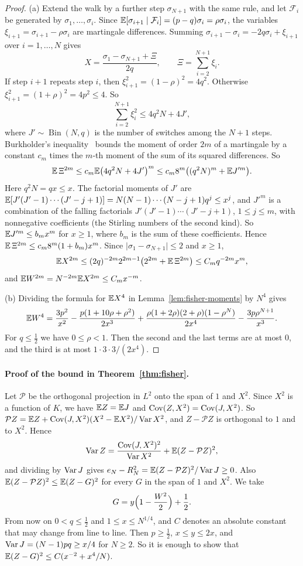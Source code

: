 \begin{proof}
(a) Extend the walk by a further step $\sigma_{N+1}$ with the same rule, and
let $\mathcal F_i$ be generated by $\sigma_1,\dots,\sigma_i$. Since
$\mathbb{E}[\sigma_{i+1}\mid\mathcal F_i]=(p-q)\sigma_i=\rho\sigma_i$, the variables
$\xi_{i+1}=\sigma_{i+1}-\rho\sigma_i$ are martingale differences. Summing
$\sigma_{i+1}-\sigma_i=-2q\sigma_i+\xi_{i+1}$ over $i=1,\dots,N$ gives
\[
 X=\frac{\sigma_1-\sigma_{N+1}+\Xi}{2q},\qquad
 \Xi=\sum_{i=2}^{N+1}\xi_i .
\]
If step $i+1$ repeats step $i$, then $\xi_{i+1}^2=(1-\rho)^2=4q^2$.
Otherwise $\xi_{i+1}^2=(1+\rho)^2=4p^2\le4$. So
\[
 \sum_{i=2}^{N+1}\xi_i^2\le4q^2N+4J',
\]
where $J'\sim\operatorname{Bin}(N,q)$ is the number of switches among the
$N+1$ steps. Burkholder's inequality~\cite[Ch.~2]{hallheyde1980} bounds the
moment of order $2m$ of a martingale by a constant $c_m$ times the $m$-th
moment of the sum of its squared differences. So
\[
 \mathbb{E}\,\Xi^{2m}\le c_m\mathbb{E}\bigl(4q^2N+4J'\bigr)^m
 \le c_m8^m\bigl((q^2N)^m+\mathbb{E} J'^m\bigr).
\]
Here $q^2N=qx\le x$. The factorial moments of $J'$ are
$\mathbb{E}[J'(J'-1)\cdots(J'-j+1)]=N(N-1)\cdots(N-j+1)q^j\le x^j$, and $J'^m$ is a
combination of the falling factorials $J'(J'-1)\cdots(J'-j+1)$, $1\le j\le
m$, with nonnegative coefficients (the Stirling numbers of the second kind).
So $\mathbb{E} J'^m\le b_mx^m$ for $x\ge1$, where $b_m$ is the sum of these
coefficients. Hence $\mathbb{E}\,\Xi^{2m}\le c_m8^m(1+b_m)x^m$. Since
$\lvert\sigma_1-\sigma_{N+1}\rvert\le2$ and $x\ge1$,
\[
 \mathbb{E} X^{2m}\le(2q)^{-2m}2^{2m-1}\bigl(2^{2m}+\mathbb{E}\,\Xi^{2m}\bigr)
 \le C_mq^{-2m}x^m ,
\]
and $\mathbb{E} W^{2m}=N^{-2m}\mathbb{E} X^{2m}\le C_mx^{-m}$.

(b) Dividing the formula for $\mathbb{E} X^4$ in Lemma~\ref{lem:fisher-moments} by
$N^4$ gives
\[
 \mathbb{E} W^4=\frac{3p^2}{x^2}-\frac{p(1+10\rho+\rho^2)}{2x^3}
 +\frac{\rho(1+2\rho)(2+\rho)(1-\rho^N)}{2x^4}-\frac{3p\rho^{N+1}}{x^3}.
\]
For $q\le\frac12$ we have $0\le\rho<1$. Then the second and the last terms
are at most $0$, and the third is at most $1\cdot3\cdot3/(2x^4)$.
\end{proof}

\paragraph{Proof of the bound in Theorem~\ref{thm:fisher}.}
Let $\mathcal P$ be the orthogonal projection in $L^2$ onto the span of $1$
and $X^2$. Since $X^2$ is a function of $K$, we have $\mathbb{E} Z=\mathbb{E} J$ and
$\operatorname{Cov}(Z,X^2)=\operatorname{Cov}(J,X^2)$. So
$\mathcal PZ=\mathbb{E} Z+\operatorname{Cov}(J,X^2)(X^2-\mathbb{E} X^2)/\operatorname{Var} X^2$, and $Z-\mathcal PZ$ is orthogonal
to $1$ and to $X^2$. Hence
\[
 \operatorname{Var} Z=\frac{\operatorname{Cov}(J,X^2)^2}{\operatorname{Var} X^2}+\mathbb{E}(Z-\mathcal PZ)^2 ,
\]
and dividing by $\operatorname{Var} J$ gives $e_N-R^2_N=\mathbb{E}(Z-\mathcal PZ)^2/\operatorname{Var} J\ge0$. Also
$\mathbb{E}(Z-\mathcal PZ)^2\le\mathbb{E}(Z-G)^2$ for every $G$ in the span of $1$ and $X^2$. We
take
\[
 G=y\Bigl(1-\frac{W^2}2\Bigr)+\frac12 .
\]
From now on $0<q\le\frac12$ and $1\le x\le N^{1/4}$, and $C$ denotes an
absolute constant that may change from line to line. Then $p\ge\frac12$,
$x\le y\le2x$, and $\operatorname{Var} J=(N-1)pq\ge x/4$ for $N\ge2$. So it is enough to
show that $\mathbb{E}(Z-G)^2\le C(x^{-2}+x^4/N)$.

